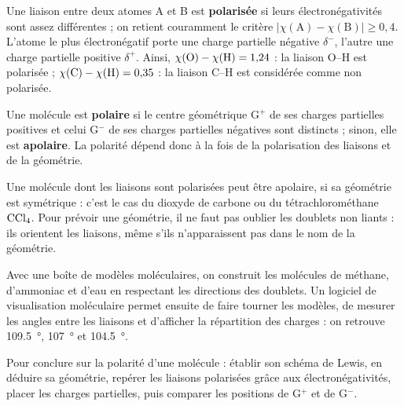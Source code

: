 \begin{propriete}
Une liaison entre deux atomes A et B est \textbf{polarisée} si leurs électronégativités sont assez différentes ; on retient
couramment le critère $\left|\chi(\mathrm{A})-\chi(\mathrm{B})\right|\geqslant0{,}4$. L'atome le plus électronégatif porte une charge partielle
négative $\delta^{-}$, l'autre une charge partielle positive $\delta^{+}$. Ainsi, $\chi(\ce{O})-\chi(\ce{H})=1{,}24$ : la liaison O--H est polarisée ;
$\chi(\ce{C})-\chi(\ce{H})=0{,}35$ : la liaison C--H est considérée comme non polarisée.
\end{propriete}
\begin{propriete}
Une molécule est \textbf{polaire} si le centre géométrique G$^{+}$ de ses charges partielles positives et celui G$^{-}$ de ses
charges partielles négatives sont distincts ; sinon, elle est \textbf{apolaire}. La polarité dépend donc à la fois de la
polarisation des liaisons et de la géométrie.
\end{propriete}
\begin{attention}
Une molécule dont les liaisons sont polarisées peut être apolaire, si sa géométrie est symétrique : c'est le cas du dioxyde de
carbone ou du tétrachlorométhane $\ce{CCl4}$. Pour prévoir une géométrie, il ne faut pas oublier les doublets non liants : ils
orientent les liaisons, même s'ils n'apparaissent pas dans le nom de la géométrie.
\end{attention}
\begin{experience}
Avec une boîte de modèles moléculaires, on construit les molécules de méthane, d'ammoniac et d'eau en respectant les
directions des doublets. Un logiciel de visualisation moléculaire permet ensuite de faire tourner les modèles, de mesurer
les angles entre les liaisons et d'afficher la répartition des charges : on retrouve \qty{109,5}{\degree}, \qty{107}{\degree} et \qty{104,5}{\degree}.
\end{experience}
\begin{rediger}
Pour conclure sur la polarité d'une molécule : établir son schéma de Lewis, en déduire sa géométrie, repérer les liaisons
polarisées grâce aux électronégativités, placer les charges partielles, puis comparer les positions de G$^{+}$ et de G$^{-}$.
\end{rediger}
\exercices

